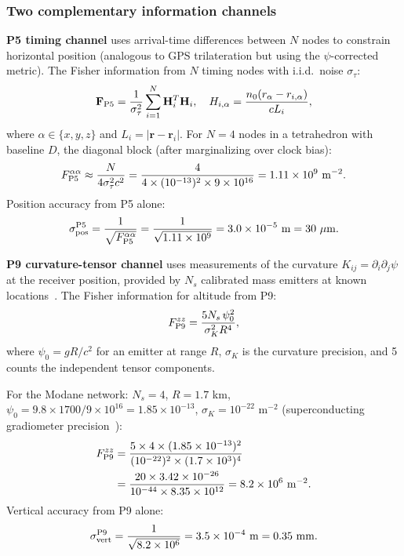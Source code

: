 \documentclass[aps,prd,twocolumn,superscriptaddress,nofootinbib,longbibliography]{revtex4-2}
\begin{document}
\subsubsection{Two complementary information channels}

\textbf{P5 timing channel} uses arrival-time differences between $N$
nodes to constrain horizontal position (analogous to GPS trilateration
but using the $\psi$-corrected metric).  The Fisher information from
$N$ timing nodes with i.i.d.\ noise $\sigma_\tau$:
\begin{equation}\label{eq:F-P5}
\mathbf{F}_{\rm P5} = \frac{1}{\sigma_\tau^2}\sum_{i=1}^N
\mathbf{H}_i^T\mathbf{H}_i,\quad
H_{i,\alpha} = \frac{n_0(r_\alpha - r_{i,\alpha})}{cL_i},
\end{equation}
where $\alpha\in\{x,y,z\}$ and $L_i = |\mathbf{r} - \mathbf{r}_i|$.
For $N = 4$ nodes in a tetrahedron with baseline $D$, the diagonal
block (after marginalizing over clock bias):
\begin{equation}
F_{\rm P5}^{\alpha\alpha} \approx \frac{N}{4\sigma_\tau^2 c^2}
= \frac{4}{4\times(10^{-13})^2\times9\times10^{16}}
= 1.11\times10^9\ \si{m^{-2}}.
\end{equation}
Position accuracy from P5 alone:
\begin{equation}
\sigma_{\rm pos}^{\rm P5} = \frac{1}{\sqrt{F_{\rm P5}^{\alpha\alpha}}}
= \frac{1}{\sqrt{1.11\times10^9}} = 3.0\times10^{-5}\ \si{m} = 30\ \mu\si{m}.
\end{equation}

\textbf{P9 curvature-tensor channel} uses measurements of the
curvature $K_{ij} = \partial_i\partial_j\psi$ at the receiver
position, provided by $N_s$ calibrated mass emitters at known
locations~\cite{AlcockPositioning2026}.  The Fisher information
for altitude from P9:
\begin{equation}\label{eq:F-P9}
F_{\rm P9}^{zz} = \frac{5N_s\,\psi_0^2}{\sigma_K^2 R^4},
\end{equation}
where $\psi_0 = gR/c^2$ for an emitter at range $R$, $\sigma_K$
is the curvature precision, and 5 counts the independent tensor components.

For the Modane network: $N_s = 4$, $R = 1.7$ km,
$\psi_0 = 9.8\times1700/9\times10^{16} = 1.85\times10^{-13}$,
$\sigma_K = 10^{-22}$ m$^{-2}$ (superconducting gradiometer
precision~\cite{Moody2002}):
\begin{align}
F_{\rm P9}^{zz} &= \frac{5\times4\times(1.85\times10^{-13})^2}
{(10^{-22})^2\times(1.7\times10^3)^4} \nonumber\\
&= \frac{20\times3.42\times10^{-26}}
{10^{-44}\times8.35\times10^{12}} = 8.2\times10^6\ \si{m^{-2}}.
\end{align}
Vertical accuracy from P9 alone:
\begin{equation}
\sigma_{\rm vert}^{\rm P9} = \frac{1}{\sqrt{8.2\times10^6}} = 3.5\times10^{-4}\ \si{m}
= 0.35\ \si{mm}.
\end{equation}
\end{document}
